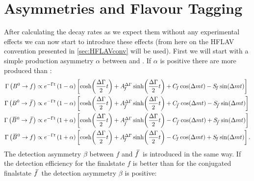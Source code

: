 \section{Asymmetries and Flavour Tagging}

After calculating the decay rates as we expect them without any experimental effects we can now start to introduce these effects
(from here on the HFLAV convention presented in \cref{sec:HFLAVconv} will be used). First we will start with a simple production
asymmetry $\alpha$ between \Bz and \Bzb. If $\alpha$ is positive there are more \Bzb produced than \Bz:
\begin{align*}
  \Gamma\left(\Bz\to f\right) &\propto e^{-\Gamma t}\left(1-\alpha\right)\left[\cosh\!\left(\frac{\Delta\Gamma}{2}t\right)
  +\ADGf\sinh\!\left(\frac{\Delta\Gamma}{2}t\right)+\Cf\cos\!\left(\Delta mt\right)-\Sf\sin\!\left(\Delta mt\right)\right]\\
  \Gamma\left(\Bz\to \fbar\right) &\propto e^{-\Gamma t}\left(1-\alpha\right)\left[\cosh\!\left(\frac{\Delta\Gamma}{2}t\right)
  +\ADGfbar\sinh\!\left(\frac{\Delta\Gamma}{2}t\right)+\Cfbar\cos\!\left(\Delta mt\right)-\Sfbar\sin\!\left(\Delta mt\right)\right]\\
  \Gamma\left(\Bzb\to \fbar\right) &\propto e^{-\Gamma t}\left(1+\alpha\right)\left[\cosh\!\left(\frac{\Delta\Gamma}{2}t\right)
  +\ADGfbar\sinh\!\left(\frac{\Delta\Gamma}{2}t\right)-\Cfbar\cos\!\left(\Delta mt\right)+\Sfbar\sin\!\left(\Delta mt\right)\right]\\
  \Gamma\left(\Bzb\to f\right) &\propto e^{-\Gamma t}\left(1+\alpha\right)\left[\cosh\!\left(\frac{\Delta\Gamma}{2}t\right)
  +\ADGf\sinh\!\left(\frac{\Delta\Gamma}{2}t\right)-\Cf\cos\!\left(\Delta mt\right)+\Sf\sin\!\left(\Delta mt\right)\right].
\end{align*}
The detection asymmetry $\beta$ between $f$ and $\mbox{\ensuremath{\kern 2.5pt\overline{\kern -2.5pt f\kern 1pt}}}$ is introduced in the same way. If the detection efficiency for the finalstate $f$
is better than for the conjugated finalstate $\mbox{\ensuremath{\kern 2.5pt\overline{\kern -2.5pt f\kern 1pt}}}$ the detection asymmetry $\beta$ is positive:
